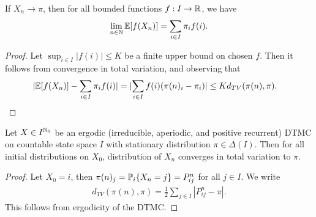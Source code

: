 \documentclass[a4paper,10pt,english]{article}
\begin{document}
\begin{lem} If $X_{n} \to \pi$, then for all bounded functions $f: I \to \R$, 
we have
\begin{align*}
\lim_{n \in \N} \E[f(X_n)] = \sum_{i \in I} \pi_i f(i).
\end{align*}
\end{lem}
\begin{proof} Let $\sup_{i \in I}|f(i)| \leq K$ be a finite upper bound on chosen $f$. Then it follows from convergence in total variation, and observing that 
\begin{align*}
 \lvert\E[f(X_n)]  - \sum_{i \in I}\pi_if(i) \rvert&=  \lvert\sum_{i \in I}f(i)(\pi(n)_i - \pi_i) \rvert \leq Kd_{TV}(\pi(n),\pi).
\end{align*}
\end{proof}
\begin{thm}
Let $X \in I^{\N_0}$ be an ergodic (irreducible, aperiodic, and positive recurrent) DTMC on countable state space $I$ with stationary distribution $\pi \in \Delta(I)$. Then for all initial distributions on $X_0$, distribution of $X_n$ converges in total variation to $\pi$.
\end{thm}
\begin{proof}
Let $X_0 = i$, then $\pi(n)_j = \P_i\{X_n = j\} = P^n_{ij}$ for all $j \in I$. We write 
\begin{align*}
d_{TV}(\pi(n),\pi) = \frac{1}{2}\sum_{j \in I}|P_{ij}^n - \pi|.
\end{align*}
This follows from ergodicity of the DTMC.
 \end{proof}
 
\end{document}
